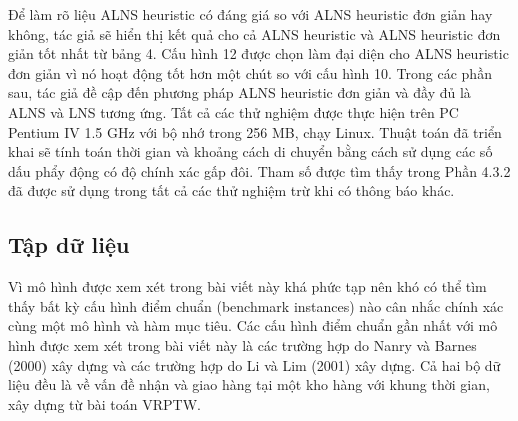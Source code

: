 Để làm rõ liệu ALNS heuristic có đáng giá so với ALNS heuristic đơn giản hay không, tác giả sẽ hiển thị kết quả cho cả ALNS heuristic và ALNS heuristic đơn giản tốt nhất từ bảng 4. Cấu hình 12 được chọn làm đại diện cho ALNS heuristic đơn giản vì nó hoạt động tốt hơn một chút so với cấu hình 10. Trong các phần sau, tác giả đề cập đến phương pháp ALNS heuristic đơn giản và đầy đủ là ALNS và LNS tương ứng.
Tất cả các thử nghiệm được thực hiện trên PC Pentium IV 1.5 GHz với bộ nhớ trong 256 MB, chạy Linux. Thuật toán đã triển khai sẽ tính toán thời gian và khoảng cách di chuyển bằng cách sử dụng các số dấu phẩy động có độ chính xác gấp đôi. Tham số được tìm thấy trong Phần 4.3.2 đã được sử dụng trong tất cả các thử nghiệm trừ khi có thông báo khác.

\subsection{Tập dữ liệu}
Vì mô hình được xem xét trong bài viết này khá phức tạp nên khó có thể tìm thấy bất kỳ cấu hình điểm chuẩn (benchmark instances) nào cân nhắc chính xác cùng một mô hình và hàm mục tiêu. Các cấu hình điểm chuẩn gần nhất với mô hình được xem xét trong bài viết này là các trường hợp do Nanry và Barnes (2000) xây dựng và các trường hợp do Li và Lim (2001) xây dựng. Cả hai bộ dữ liệu đều là về vấn đề nhận và giao hàng tại một kho hàng với khung thời gian, xây dựng từ bài toán VRPTW.

